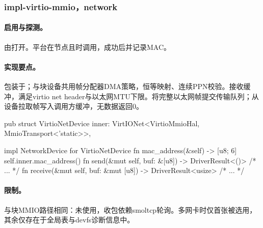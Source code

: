 
\subsubsection{impl-virtio-mmio，network}

\paragraph{启用与探测。}由打开。平台在节点且时调用，成功后并记录MAC。

\paragraph{实现要点。}包装于；与块设备共用帧分配器DMA策略，恒等映射、连续PPN校验。接收缓冲，满足virtio net header与以太网MTU下限。将完整以太网帧提交传输队列；从设备拉取帧写入调用方缓冲，无数据返回0。

\begin{rustcode}
pub struct VirtioNetDevice {
    inner: VirtIONet<VirtioMmioHal, MmioTransport<'static>>,
}

impl NetworkDevice for VirtioNetDevice {
    fn mac_address(&self) -> [u8; 6] {
        self.inner.mac_address()
    }
    fn send(&mut self, buf: &[u8]) -> DriverResult<()> { /* ... */ }
    fn receive(&mut self, buf: &mut [u8]) -> DriverResult<usize> { /* ... */ }
}
\end{rustcode}

\paragraph{限制。}与块MMIO路径相同：未使用，收包依赖smoltcp轮询。多网卡时仅首张被选用，其余仅存在于全局表与devfs诊断信息中。
